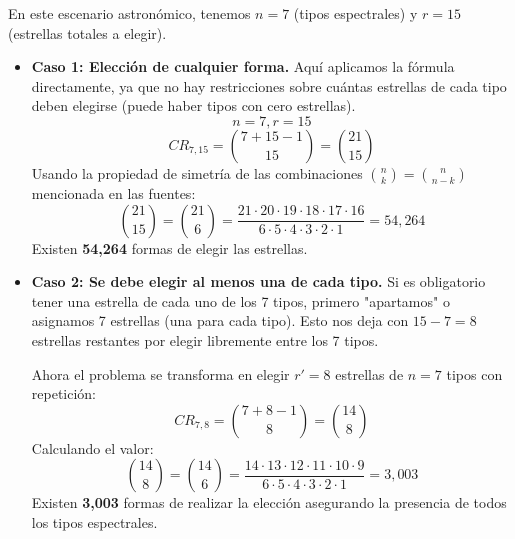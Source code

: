 \documentclass[a4paper]{article}
\begin{document}
\begin{enumerate}[a.]
    En este escenario astronómico, tenemos $n = 7$ (tipos espectrales) y $r = 15$ (estrellas totales a elegir).
    
    \begin{itemize}
        \item \textbf{Caso 1: Elección de cualquier forma.}
        Aquí aplicamos la fórmula directamente, ya que no hay restricciones sobre cuántas estrellas de cada tipo deben elegirse (puede haber tipos con cero estrellas).
        $$ n = 7, r = 15 $$
        $$ CR_{7,15} = \binom{7 + 15 - 1}{15} = \binom{21}{15} $$
        Usando la propiedad de simetría de las combinaciones $\binom{n}{k} = \binom{n}{n-k}$ mencionada en las fuentes:
        $$ \binom{21}{15} = \binom{21}{6} = \frac{21 \cdot 20 \cdot 19 \cdot 18 \cdot 17 \cdot 16}{6 \cdot 5 \cdot 4 \cdot 3 \cdot 2 \cdot 1} = 54,264 $$
        Existen \textbf{54,264} formas de elegir las estrellas.

        \item \textbf{Caso 2: Se debe elegir al menos una de cada tipo.}
        Si es obligatorio tener una estrella de cada uno de los 7 tipos, primero "apartamos" o asignamos 7 estrellas (una para cada tipo). Esto nos deja con $15 - 7 = 8$ estrellas restantes por elegir libremente entre los 7 tipos.
        
        Ahora el problema se transforma en elegir $r' = 8$ estrellas de $n = 7$ tipos con repetición:
        $$ CR_{7,8} = \binom{7 + 8 - 1}{8} = \binom{14}{8} $$
        Calculando el valor:
        $$ \binom{14}{8} = \binom{14}{6} = \frac{14 \cdot 13 \cdot 12 \cdot 11 \cdot 10 \cdot 9}{6 \cdot 5 \cdot 4 \cdot 3 \cdot 2 \cdot 1} = 3,003 $$
        Existen \textbf{3,003} formas de realizar la elección asegurando la presencia de todos los tipos espectrales.
    \end{itemize}
\end{enumerate}







 
\end{document}

